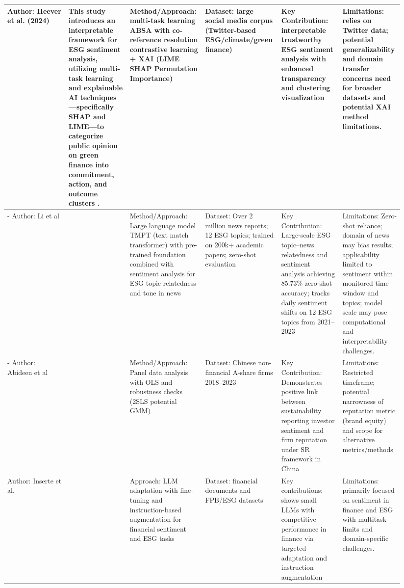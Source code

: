 \documentclass{article}
\begin{document}
\begin{landscape}
\begin{longtable}{p{0.157\linewidth} p{0.157\linewidth} p{0.157\linewidth} p{0.157\linewidth} p{0.157\linewidth} p{0.157\linewidth}}
Author: Heever et al. (2024) & This study introduces an interpretable framework for ESG sentiment analysis, utilizing multi-task learning and explainable AI techniques—specifically SHAP and LIME—to categorize public opinion on green finance into commitment, action, and outcome clusters  \parencite{wihan_van_der_heever_44c76c99}. & Method/Approach: multi-task learning ABSA with co-reference resolution contrastive learning + XAI (LIME SHAP Permutation Importance) & Dataset: large social media corpus (Twitter-based ESG/climate/green finance) & Key Contribution: interpretable trustworthy ESG sentiment analysis with enhanced transparency and clustering visualization & Limitations: relies on Twitter data; potential generalizability and domain transfer concerns need for broader datasets and potential XAI method limitations. \\ \hline
- Author: Li et al & ~ & Method/Approach: Large language model TMPT (text match transformer) with pre-trained foundation combined with sentiment analysis for ESG topic relatedness and tone in news & Dataset: Over 2 million news reports; 12 ESG topics; trained on 200k+ academic papers; zero-shot evaluation & Key Contribution: Large-scale ESG topic–news relatedness and sentiment analysis achieving 85.73\% zero-shot accuracy; tracks daily sentiment shifts on 12 ESG topics from 2021–2023 & Limitations: Zero-shot reliance; domain of news may bias results; applicability limited to sentiment within monitored time window and topics; model scale may pose computational and interpretability challenges. \\ \hline
- Author: Abideen et al & ~ & Method/Approach: Panel data analysis with OLS and robustness checks (2SLS potential GMM) & Dataset: Chinese non-financial A-share firms 2018–2023 & Key Contribution: Demonstrates positive link between sustainability reporting investor sentiment and firm reputation under SR framework in China & Limitations: Restricted timeframe; potential narrowness of reputation metric (brand equity) and scope for alternative metrics/methods \\ \hline
Author: Inserte et al. & ~ & Approach: LLM adaptation with fine-tuning and instruction-based augmentation for financial sentiment and ESG tasks & Dataset: financial documents and FPB/ESG datasets & Key contributions: shows small LLMs with competitive performance in finance via targeted adaptation and instruction augmentation & Limitations: primarily focused on sentiment in finance and ESG with multitask limits and domain-specific challenges. \\ \hline

\end{longtable}
\end{landscape}
\end{document}
